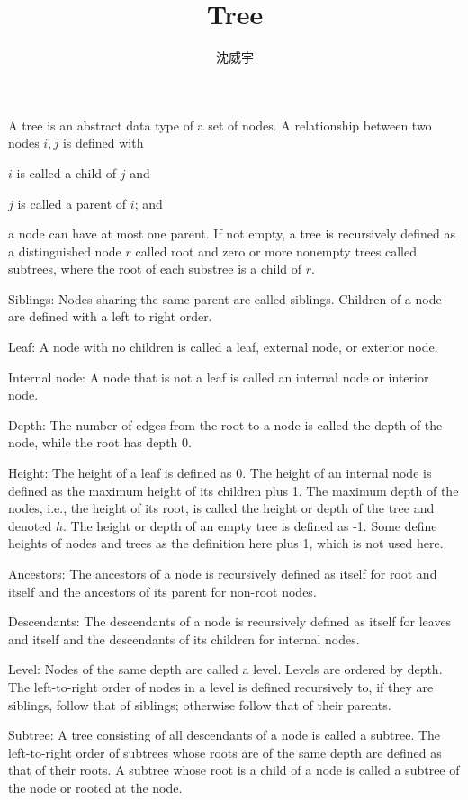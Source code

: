 \documentclass[a4paper,12pt]{article}
\begin{document}
\title{Tree}
\author{沈威宇}
\date{\temtoday}
\titledoc
{}
A tree is an abstract data type of a set of nodes. A relationship between two nodes $i,j$ is defined with
\bit
\item $i$ is called a child of $j$ and
\item $j$ is called a parent of $i$; and
\item a node can have at most one parent.
\eit
If not empty, a tree is recursively defined as a distinguished node $r$ called root and zero or more nonempty trees called subtrees, where the root of each substree is a child of $r$.
\bit
\item Siblings: Nodes sharing the same parent are called siblings. Children of a node are defined with a left to right order.
\item Leaf: A node with no children is called a leaf, external node, or exterior node.
\item Internal node: A node that is not a leaf is called an internal node or interior node.
\item Depth: The number of edges from the root to a node is called the depth of the node, while the root has depth $0$.
\item Height: The height of a leaf is defined as 0. The height of an internal node is defined as the maximum height of its children plus 1. The maximum depth of the nodes, i.e., the height of its root, is called the height or depth of the tree and denoted $h$. The height or depth of an empty tree is defined as -1. Some define heights of nodes and trees as the definition here plus 1, which is not used here.
\item Ancestors: The ancestors of a node is recursively defined as itself for root and itself and the ancestors of its parent for non-root nodes.
\item Descendants: The descendants of a node is recursively defined as itself for leaves and itself and the descendants of its children for internal nodes.
\item Level: Nodes of the same depth are called a level. Levels are ordered by depth. The left-to-right order of nodes in a level is defined recursively to, if they are siblings, follow that of siblings; otherwise follow that of their parents.
\item Subtree: A tree consisting of all descendants of a node is called a subtree. The left-to-right order of subtrees whose roots are of the same depth are defined as that of their roots. A subtree whose root is a child of a node is called a subtree of the node or rooted at the node.
\end{document}
